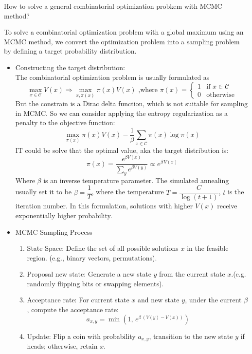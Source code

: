 \begin{homeworkProblem}

How to solve a general combinatorial optimization probkem with MCMC method?

\solution

To solve a combinatorial optimization problem with a global maximum using an MCMC method, we convert the optimization problem into a sampling problem by defining a target probability distribution.

\begin{itemize}
\item Constructing the target distribution: \\
The combinatorial optimization problem is usually formulated as
$$\max_{x\in\mathcal{C}}  V(x)\Rightarrow \max_{x,\pi(x)} \pi(x)V(x) \text{ ,where } \pi(x) = \begin{cases}
1 & \text{if } x \in \mathcal{C
} \\
0 & \text{otherwise}
\end{cases}$$
But the constrain is a Dirac delta function, which is not suitable for sampling in MCMC. So we can consider applying the entropy regularization as a penalty to the objective function:
$$\max_{\pi(x)} \pi(x)V(x) - \dfrac{1}{\beta}\sum_{x\in\mathcal{C}}\pi(x)\log\pi(x)$$
IT could be solve that the optimal value, aka the target distribution is:
$$\pi(x) = \dfrac{e^{\beta V(x)}}{\sum\limits_{y}e^{\beta V(y)}} \propto e^{\beta\,V(x)}$$
Where $\beta$ is an inverse temperature parameter. The simulated annealing usually set it to be $\beta=\dfrac{1}{T}$, where the temperature $T=\dfrac{C}{\log(t+1)}$, $t$ is the iteration number. In this formulation, solutions with higher $V(x)$ receive exponentially higher probability.

\item MCMC Sampling Process
\begin{enumerate}
\item State Space: Define the set of all possible solutions $x$ in the feasible region. (e.g., binary vectors, permutations).
\item Proposal new state: Generate a new state $y$ from the current state $x$.(e.g. randomly flipping bits or swapping elements).
\item Acceptance rate: For current state $x$ and new state $y$, under the current $\beta$, compute the acceptance rate:
$$a_{x,y} = \min\left(1,\, e^{\beta\,(V(y)-V(x))}\right)$$
\item Update: Flip a coin with probability $a_{x,y}$, transition to the new state $y$ if heads; otherwise, retain $x$.
\end{enumerate}
\end{itemize}


\end{homeworkProblem}
